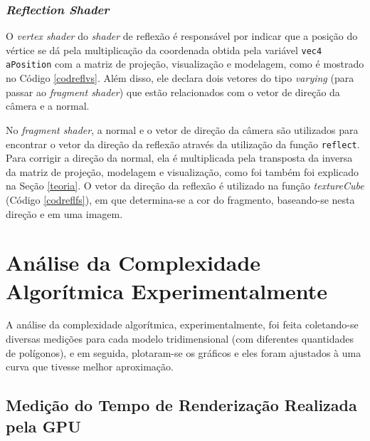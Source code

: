 	
	
\subsubsection{\textit{Reflection Shader}}

	O \textit{vertex shader} do \textit{shader} de reflexão é responsável por indicar que a posição do vértice se dá pela multiplicação da coordenada obtida pela variável \texttt{vec4 aPosition} com a matriz de projeção, visualização e modelagem, como é mostrado no Código \ref{codreflvs}. Além disso, ele declara dois vetores do tipo \textit{varying} (para passar ao \textit{fragment shader}) que estão relacionados com o vetor de direção da câmera e a normal. 

	

	No \textit{fragment shader}, a normal e o vetor de direção da câmera são utilizados para encontrar o vetor da direção da reflexão através da utilização da função \texttt{reflect}. Para corrigir a direção da normal, ela é multiplicada pela transposta da inversa da matriz de projeção, modelagem e visualização, como foi também foi explicado na Seção \ref{teoria}. O vetor da direção da reflexão é utilizado na função \textit{textureCube} (Código \ref{codreflfs}), em que determina-se a cor do fragmento, baseando-se nesta direção e em uma imagem. 

	

\section{Análise da Complexidade Algorítmica Experimentalmente}

	A análise da complexidade algorítmica, experimentalmente, foi feita coletando-se diversas medições para cada modelo tridimensional (com diferentes quantidades de polígonos), e em seguida, plotaram-se os gráficos e eles foram ajustados à uma curva que tivesse melhor aproximação.  

\subsection{Medição do Tempo de Renderização Realizada pela GPU}
\label{gpu}

